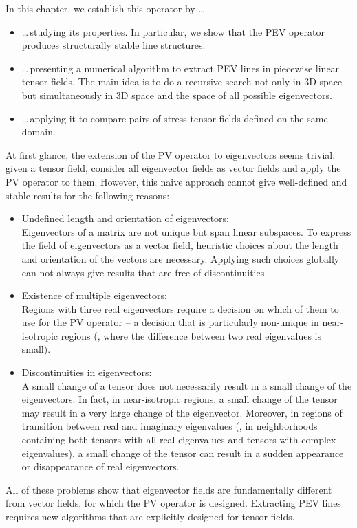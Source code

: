 %
In this chapter, we establish this operator by \ldots
%
\begin{itemize}
    \item
    \ldots{}\,studying its properties.
    In particular, we show that the \ac{PEV} operator produces structurally
    stable line structures.
    \item
    \ldots{}\,presenting a numerical algorithm to extract \ac{PEV} lines in
    piecewise linear tensor fields.
    The main idea is to do a recursive search not only in \ac{3D} space but
    simultaneously in \ac{3D} space and the space of all possible eigenvectors.
    \item
    \ldots{}\,applying it to compare pairs of stress tensor fields defined on
    the same domain.
\end{itemize}
%
At first glance, the extension of the \ac{PV} operator to eigenvectors seems
trivial:
%
given a tensor field, consider all eigenvector fields as vector fields and apply
the \ac{PV} operator to them.
%
However, this naive approach cannot give well-defined and stable results for
the following reasons:
%
\begin{itemize}
    \item Undefined length and orientation of eigenvectors:\\
    Eigenvectors of a matrix are not unique but span linear subspaces.
    To express the field of eigenvectors as a vector field, heuristic
    choices about the length and orientation of the vectors are necessary.
    Applying such choices globally can not always give results that are free of
    discontinuities
    \item Existence of multiple eigenvectors:\\
    Regions with three real eigenvectors require a decision on which of them to
    use for the \ac{PV} operator -- a decision that is particularly non-unique
    in near-isotropic regions
    (\ie, where the difference between two real eigenvalues is small).
    \item Discontinuities in eigenvectors:\\
    A small change of a tensor does not necessarily result in a small change of
    the eigenvectors.
    In fact, in near-isotropic regions, a small change of the tensor may result
    in a very large change of the eigenvector.
    Moreover, in regions of transition between real and imaginary eigenvalues
    (\ie, in neighborhoods containing both tensors with all real eigenvalues and
    tensors with complex eigenvalues), a small change of the tensor can result
    in a sudden appearance or disappearance of real eigenvectors.
\end{itemize}
%
All of these problems show that eigenvector fields are fundamentally different
from vector fields, for which the \ac{PV} operator is designed.
%
Extracting \ac{PEV} lines requires new algorithms that are explicitly designed
for tensor fields.
%


